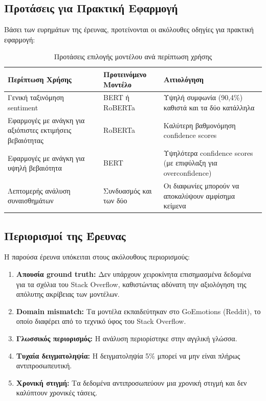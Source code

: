 \documentclass[a4paper,11pt,oneside,openany]{ioniothesis}
\begin{document}
\subsection{Προτάσεις για Πρακτική Εφαρμογή}
\label{sec:Προτάσεις για Πρακτική Εφαρμογή}

Βάσει των ευρημάτων της έρευνας, προτείνονται οι ακόλουθες οδηγίες για πρακτική εφαρμογή:

\begin{table}[H]
\centering
\caption{Προτάσεις επιλογής μοντέλου ανά περίπτωση χρήσης}
\label{tab:model_recommendations}
\begin{tabular}{@{}p{4cm}p{4cm}p{5.5cm}@{}}
\toprule
\textbf{Περίπτωση Χρήσης} & \textbf{Προτεινόμενο Μοντέλο} & \textbf{Αιτιολόγηση} \\
\midrule
Γενική ταξινόμηση sentiment & BERT ή RoBERTa & Υψηλή συμφωνία (90,4\%) καθιστά και τα δύο κατάλληλα \\
\midrule
Εφαρμογές με ανάγκη για αξιόπιστες εκτιμήσεις βεβαιότητας & RoBERTa & Καλύτερη βαθμονόμηση confidence scores \\
\midrule
Εφαρμογές με ανάγκη για υψηλή βεβαιότητα & BERT & Υψηλότερα confidence scores (με επιφύλαξη για overconfidence) \\
\midrule
Λεπτομερής ανάλυση συναισθημάτων & Συνδυασμός και των δύο & Οι διαφωνίες μπορούν να αποκαλύψουν αμφίσημα κείμενα \\
\bottomrule
\end{tabular}
\end{table}

\subsection{Περιορισμοί της Έρευνας}
\label{sec:Περιορισμοί της Έρευνας}

Η παρούσα έρευνα υπόκειται στους ακόλουθους περιορισμούς:

\begin{enumerate}
    \item \textbf{Απουσία ground truth:} Δεν υπάρχουν χειροκίνητα επισημασμένα δεδομένα για τα σχόλια του Stack Overflow, καθιστώντας αδύνατη την αξιολόγηση της απόλυτης ακρίβειας των μοντέλων.
    
    \item \textbf{Domain mismatch:} Τα μοντέλα εκπαιδεύτηκαν στο GoEmotions (Reddit), το οποίο διαφέρει από το τεχνικό ύφος του Stack Overflow.
    
    \item \textbf{Γλωσσικός περιορισμός:} Η ανάλυση περιορίστηκε στην αγγλική γλώσσα.
    
    \item \textbf{Τυχαία δειγματοληψία:} Η δειγματοληψία 5\% μπορεί να μην είναι πλήρως αντιπροσωπευτική.
    
    \item \textbf{Χρονική στιγμή:} Τα δεδομένα αντιπροσωπεύουν μια χρονική στιγμή και δεν καλύπτουν χρονικές τάσεις.
\end{enumerate}
\end{document}
